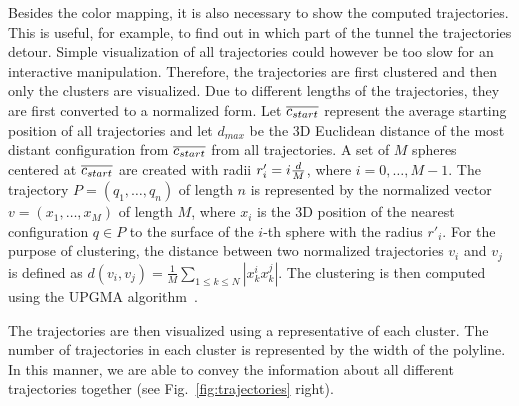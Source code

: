 \documentclass{svmult}
\begin{document}
Besides the color mapping, it is also necessary to show the computed trajectories.
This is useful, for example, to find out in which part of the tunnel the trajectories detour.
Simple visualization of all trajectories could however be too slow for an interactive manipulation.
Therefore, the trajectories are first clustered and then only the clusters are visualized.
Due to different lengths of the trajectories, they are first converted to a normalized form.
Let $\overline{c_{start}}$ represent the average starting position of all trajectories and let $d_{max}$ be the 3D Euclidean distance
of the most distant configuration from $\overline{c_{start}}$ from all trajectories.
A set of $M$ spheres centered at $\overline{c_{start}}$ are created with radii $r'_i=i {d \over M}$, where $i=0,\ldots, M-1$.
The trajectory $P=(q_1,\ldots,q_n)$ of length $n$ is represented by the normalized vector $v=(x_1,\ldots,x_M)$ of length $M$,
where $x_i$ is the 3D position of the nearest configuration $q \in P$ to the surface of the $i$-th sphere with the radius $r'_i$.
For the purpose of clustering, the distance between two normalized trajectories $v_i$ and $v_j$ is defined as
$d(v_i, v_j) = \frac{1}{M} \sum_{1 \leq k \leq N} |x_k^i x_k^j|$.
The clustering is then computed using the UPGMA algorithm~\cite{sokal1958statistical}.

The trajectories are then visualized using a representative of each cluster.
The number of trajectories in each cluster is represented by the width of the polyline.
In this manner, we are able to convey the information about all different trajectories together (see Fig.~\ref{fig:trajectories} right).
\end{document}

